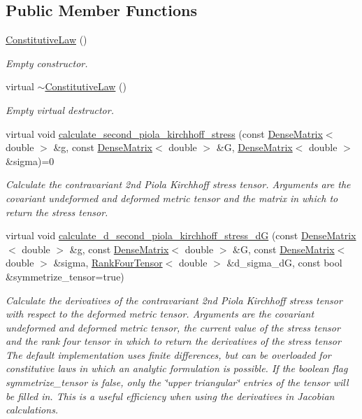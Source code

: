 \subsection*{Public Member Functions}
\begin{DoxyCompactItemize}
\item 
\hyperlink{classoomph_1_1ConstitutiveLaw_a864c36413e8ea31e63552f3db3b97a2f}{Constitutive\+Law} ()
\begin{DoxyCompactList}\small\item\em Empty constructor. \end{DoxyCompactList}\item 
virtual \hyperlink{classoomph_1_1ConstitutiveLaw_aa75b88c826723ba090ace39c26da0ae6}{$\sim$\+Constitutive\+Law} ()
\begin{DoxyCompactList}\small\item\em Empty virtual destructor. \end{DoxyCompactList}\item 
virtual void \hyperlink{classoomph_1_1ConstitutiveLaw_a93527d910de908035feb8f41b0401065}{calculate\+\_\+second\+\_\+piola\+\_\+kirchhoff\+\_\+stress} (const \hyperlink{classoomph_1_1DenseMatrix}{Dense\+Matrix}$<$ double $>$ \&g, const \hyperlink{classoomph_1_1DenseMatrix}{Dense\+Matrix}$<$ double $>$ \&G, \hyperlink{classoomph_1_1DenseMatrix}{Dense\+Matrix}$<$ double $>$ \&sigma)=0
\begin{DoxyCompactList}\small\item\em Calculate the contravariant 2nd Piola Kirchhoff stress tensor. Arguments are the covariant undeformed and deformed metric tensor and the matrix in which to return the stress tensor. \end{DoxyCompactList}\item 
virtual void \hyperlink{classoomph_1_1ConstitutiveLaw_a6076752384082cfa3de3e0cf17daa9aa}{calculate\+\_\+d\+\_\+second\+\_\+piola\+\_\+kirchhoff\+\_\+stress\+\_\+dG} (const \hyperlink{classoomph_1_1DenseMatrix}{Dense\+Matrix}$<$ double $>$ \&g, const \hyperlink{classoomph_1_1DenseMatrix}{Dense\+Matrix}$<$ double $>$ \&G, const \hyperlink{classoomph_1_1DenseMatrix}{Dense\+Matrix}$<$ double $>$ \&sigma, \hyperlink{classoomph_1_1RankFourTensor}{Rank\+Four\+Tensor}$<$ double $>$ \&d\+\_\+sigma\+\_\+dG, const bool \&symmetrize\+\_\+tensor=true)
\begin{DoxyCompactList}\small\item\em Calculate the derivatives of the contravariant 2nd Piola Kirchhoff stress tensor with respect to the deformed metric tensor. Arguments are the covariant undeformed and deformed metric tensor, the current value of the stress tensor and the rank four tensor in which to return the derivatives of the stress tensor The default implementation uses finite differences, but can be overloaded for constitutive laws in which an analytic formulation is possible. If the boolean flag symmetrize\+\_\+tensor is false, only the \char`\"{}upper  triangular\char`\"{} entries of the tensor will be filled in. This is a useful efficiency when using the derivatives in Jacobian calculations. \end{DoxyCompactList}\item 

\end{DoxyCompactItemize}
